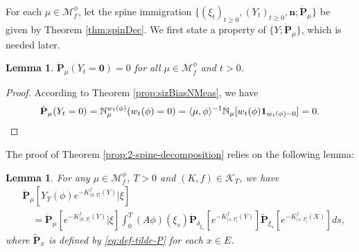 \documentclass[UTF8]{pkuthss}
\theoremstyle{plain}
\newtheorem{lem}[thm]{Lemma}
\theoremstyle{definition}
\numberwithin{equation}{section}
\begin{document}
 For each $\mu \in \mathcal M_f^\phi$, let the spine immigration $\{(\xi_t)_{t\geq 0}, (Y_t)_{t\geq 0}, \mathbf n; \dot {\mathbf P}_\mu\}$ be given by Theorem \ref{thm:spinDec}.
	We first state a property of $\{Y; \dot{\mathbf P}_\mu\}$, which is needed later.
\begin{lem}\label{lem:Y-is-immortal}
	$\dot{\mathbf P}_\mu(Y_t = \mathbf 0) = 0$ for all $\mu \in \mathcal M_f^\phi$ and $t>0$.
\end{lem}
\begin{proof}
	According to Theorem \ref{prop:sizBiasNMeas}, we have
\[
	\dot{\mathbf P}_\mu (Y_t = 0)
	= \mathbb N^{w_t(\phi)}_\mu ( w_t(\phi) = 0 )
	= \langle \mu, \phi \rangle^{-1} \mathbb N_\mu [ w_t(\phi) \mathbf 1_{w_t(\phi) = 0}]
	= 0. \qedhere
\]
\end{proof}
\par
	The proof of Theorem \ref{prop:2-spine-decomposition} relies on the following lemma:
\begin{lem}
\label{lem:key-lemma}
	For any $\mu\in \mathcal M_f^\phi$, $T>0$ and $(K,f)\in \mathcal K_T$, we have
\begin{align}
    &\dot{\mathbf P}_\mu [Y_T(\phi) e^{-K_{(0, T]}^f(Y)}|\xi]\\
    &\quad =\dot{\mathbf P}_\mu[e^{-K_{(0, T]}^f(Y)}|\xi]\int_0^T  (A\phi)(\xi_s)\dot{\mathbf P}_{\delta_{\xi_s}}[e^{-K_{(s, T]}^f(Y)}]\widetilde {\mathbf P}_{\xi_s}[e^{-K^f_{(s, T]}(X)}]ds,
\end{align}
where $\widetilde {\mathbf P}_{x}$ is defined by \eqref{eq:def-tilde-P} for each $x\in E$.
\end{lem}
\end{document}
